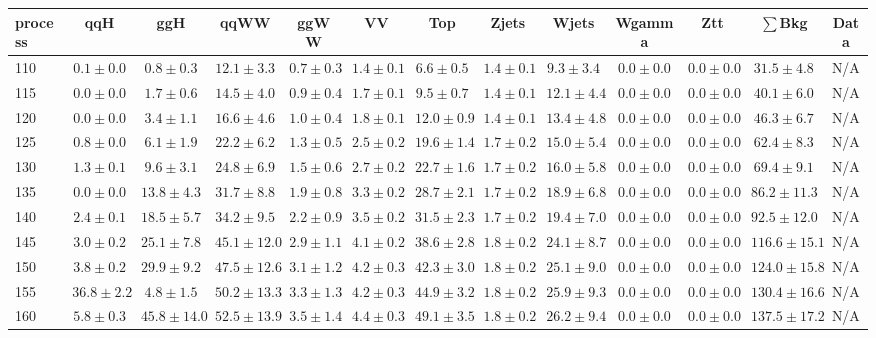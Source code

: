 \begin{table}
{%
 \tiny
 \begin{center}
 \begin{tabular}{l | c c | c c c c c c c c  | c c}
 \hline
 process & qqH & ggH & qqWW & ggWW & VV & Top & Zjets & Wjets & Wgamma & Ztt & $\sum$Bkg & Data \\
 \hline
110 & $0.1\pm0.0$ & $0.8\pm0.3$ & $12.1\pm3.3$ & $0.7\pm0.3$ & $1.4\pm0.1$ & $6.6\pm0.5$ & $1.4\pm0.1$ & $9.3\pm3.4$ & $0.0\pm0.0$ & $0.0\pm0.0$ & $31.5\pm4.8$ & N/A \\
115 & $0.0\pm0.0$ & $1.7\pm0.6$ & $14.5\pm4.0$ & $0.9\pm0.4$ & $1.7\pm0.1$ & $9.5\pm0.7$ & $1.4\pm0.1$ & $12.1\pm4.4$ & $0.0\pm0.0$ & $0.0\pm0.0$ & $40.1\pm6.0$ & N/A \\
120 & $0.0\pm0.0$ & $3.4\pm1.1$ & $16.6\pm4.6$ & $1.0\pm0.4$ & $1.8\pm0.1$ & $12.0\pm0.9$ & $1.4\pm0.1$ & $13.4\pm4.8$ & $0.0\pm0.0$ & $0.0\pm0.0$ & $46.3\pm6.7$ & N/A \\
125 & $0.8\pm0.0$ & $6.1\pm1.9$ & $22.2\pm6.2$ & $1.3\pm0.5$ & $2.5\pm0.2$ & $19.6\pm1.4$ & $1.7\pm0.2$ & $15.0\pm5.4$ & $0.0\pm0.0$ & $0.0\pm0.0$ & $62.4\pm8.3$ & N/A \\
130 & $1.3\pm0.1$ & $9.6\pm3.1$ & $24.8\pm6.9$ & $1.5\pm0.6$ & $2.7\pm0.2$ & $22.7\pm1.6$ & $1.7\pm0.2$ & $16.0\pm5.8$ & $0.0\pm0.0$ & $0.0\pm0.0$ & $69.4\pm9.1$ & N/A \\
135 & $0.0\pm0.0$ & $13.8\pm4.3$ & $31.7\pm8.8$ & $1.9\pm0.8$ & $3.3\pm0.2$ & $28.7\pm2.1$ & $1.7\pm0.2$ & $18.9\pm6.8$ & $0.0\pm0.0$ & $0.0\pm0.0$ & $86.2\pm11.3$ & N/A \\
140 & $2.4\pm0.1$ & $18.5\pm5.7$ & $34.2\pm9.5$ & $2.2\pm0.9$ & $3.5\pm0.2$ & $31.5\pm2.3$ & $1.7\pm0.2$ & $19.4\pm7.0$ & $0.0\pm0.0$ & $0.0\pm0.0$ & $92.5\pm12.0$ & N/A \\
145 & $3.0\pm0.2$ & $25.1\pm7.8$ & $45.1\pm12.0$ & $2.9\pm1.1$ & $4.1\pm0.2$ & $38.6\pm2.8$ & $1.8\pm0.2$ & $24.1\pm8.7$ & $0.0\pm0.0$ & $0.0\pm0.0$ & $116.6\pm15.1$ & N/A \\
150 & $3.8\pm0.2$ & $29.9\pm9.2$ & $47.5\pm12.6$ & $3.1\pm1.2$ & $4.2\pm0.3$ & $42.3\pm3.0$ & $1.8\pm0.2$ & $25.1\pm9.0$ & $0.0\pm0.0$ & $0.0\pm0.0$ & $124.0\pm15.8$ & N/A \\
155 & $36.8\pm2.2$ & $4.8\pm1.5$ & $50.2\pm13.3$ & $3.3\pm1.3$ & $4.2\pm0.3$ & $44.9\pm3.2$ & $1.8\pm0.2$ & $25.9\pm9.3$ & $0.0\pm0.0$ & $0.0\pm0.0$ & $130.4\pm16.6$ & N/A \\
160 & $5.8\pm0.3$ & $45.8\pm14.0$ & $52.5\pm13.9$ & $3.5\pm1.4$ & $4.4\pm0.3$ & $49.1\pm3.5$ & $1.8\pm0.2$ & $26.2\pm9.4$ & $0.0\pm0.0$ & $0.0\pm0.0$ & $137.5\pm17.2$ & N/A \\

\end{tabular}
\end{center}}
\end{table}
